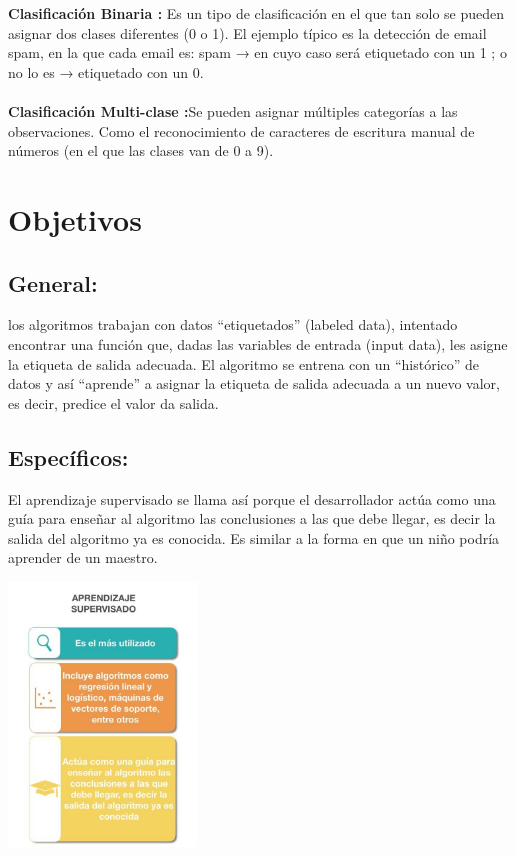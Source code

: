 \documentclass[%
 reprint,
 amsmath,amssymb,
 aps,
]{revtex4-1}
\begin{document}
 \textbf{Clasificación Binaria :} Es un tipo de clasificación en el que tan solo se pueden asignar dos clases diferentes (0 o 1). El ejemplo típico es la detección de email spam, en la que cada email es: spam → en cuyo caso será etiquetado con un 1 ; o no lo es → etiquetado con un 0.\\\\
  \textbf{Clasificación Multi-clase :}Se pueden asignar múltiples categorías a las observaciones. Como el reconocimiento de caracteres de escritura manual de números (en el que las clases van de 0 a 9).

 
\section{Objetivos}\label{sec:2}
\subsection{General:}
los algoritmos trabajan con datos “etiquetados” (labeled data), intentado encontrar una función que, dadas las variables de entrada (input data), les asigne la etiqueta de salida adecuada. El algoritmo se entrena con un “histórico” de datos y así “aprende” a asignar la etiqueta de salida adecuada a un nuevo valor, es decir, predice el valor da salida.
\subsection{Específicos:}
El aprendizaje supervisado se llama así porque el desarrollador actúa como una guía para enseñar al algoritmo las conclusiones a las que debe llegar, es decir la salida del algoritmo ya es conocida. Es similar a la forma en que un niño podría aprender de un maestro.
 \begin{center}
\includegraphics[width=5cm]{./Imagenes/objetivoprincipal}
\end{center}
\end{document}
